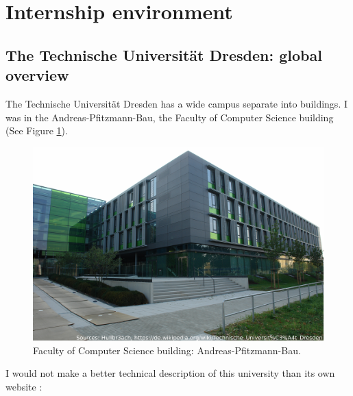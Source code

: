 \documentclass[a4paper,11pt]{report}
\begin{document}
\section{Internship environment}

\subsection{The Technische Universität Dresden: global overview}

The Technische Universität Dresden has a wide campus separate into buildings. I was in the Andreas-Pfitzmann-Bau, the Faculty of Computer Science building (See Figure \ref{informatik_bau}).

\begin{figure}[ht]
\begin{center}
\includegraphics[width=1\linewidth]{images/informatik_bau.jpg}
\caption{Faculty of Computer Science building: Andreas-Pfitzmann-Bau.}
\label{informatik_bau}
\end{center}
\end{figure}

I would not make a better technical description of this university than its own website \cite{tud:website}:
\end{document}
